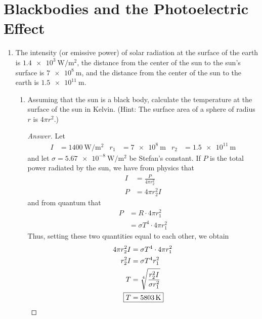 \documentclass[../psets.tex]{subfiles}
\begin{document}
\section{Blackbodies and the Photoelectric Effect}
\begin{enumerate}
    \item {}The intensity (or emissive power) of solar radiation at the surface of the earth is $\SI[per-mode=symbol]{1.4e3}{\watt\per\square\meter}$, the distance from the center of the sun to the sun's surface is $\SI{7e8}{\meter}$, and the distance from the center of the sun to the earth is $\SI{1.5e11}{\meter}$.
    \begin{enumerate}
        \item Assuming that the sun is a black body, calculate the temperature at the surface of the sun in Kelvin. (Hint: The surface area of a sphere of radius $r$ is $4\pi r^2$.)
        \begin{proof}[Answer]
            Let
            \begin{align*}
                I &= \SI[per-mode=fraction]{1400}{\watt\per\square\meter}&
                r_1 &= \SI{7e8}{\meter}&
                r_2 &= \SI{1.5e11}{\meter}
            \end{align*}
            and let $\sigma=\SI{5.67e-8}{\watt\per\square\meter}$ be Stefan's constant. If $P$ is the total power radiated by the sun, we have from physics that
            \begin{align*}
                I &= \frac{P}{4\pi r_2^2}\\
                P &= 4\pi r_2^2I
            \end{align*}
            and from quantum that
            \begin{align*}
                P &= R\cdot 4\pi r_1^2\\
                &= \sigma T^4\cdot 4\pi r_1^2
            \end{align*}
            Thus, setting these two quantities equal to each other, we obtain
            \begin{align*}
                4\pi r_2^2I &= \sigma T^4\cdot 4\pi r_1^2\\
                r_2^2I &= \sigma T^4r_1^2\\
                T &= \sqrt[4]{\frac{r_2^2I}{\sigma r_1^2}}\\
                \Aboxed{T &= \SI{5803}{\kelvin}}
            \end{align*}
        \end{proof}

\end{enumerate}
\end{enumerate}
\end{document}
